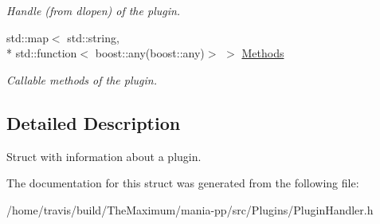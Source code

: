 \begin{DoxyCompactItemize}
\begin{DoxyCompactList}\small\item\em Handle (from dlopen) of the plugin. \end{DoxyCompactList}\item 
\hypertarget{structPluginInfo_a4fda3e831fda01ac915ce3a5dbcefcfd}{std\-::map$<$ std\-::string, \\*
std\-::function$<$ boost\-::any(boost\-::any)$>$ $>$ \hyperlink{structPluginInfo_a4fda3e831fda01ac915ce3a5dbcefcfd}{Methods}}\label{structPluginInfo_a4fda3e831fda01ac915ce3a5dbcefcfd}

\begin{DoxyCompactList}\small\item\em Callable methods of the plugin. \end{DoxyCompactList}\end{DoxyCompactItemize}


\subsection{Detailed Description}
Struct with information about a plugin. 

The documentation for this struct was generated from the following file\-:\begin{DoxyCompactItemize}
\item 
/home/travis/build/\-The\-Maximum/mania-\/pp/src/\-Plugins/Plugin\-Handler.\-h\end{DoxyCompactItemize}
